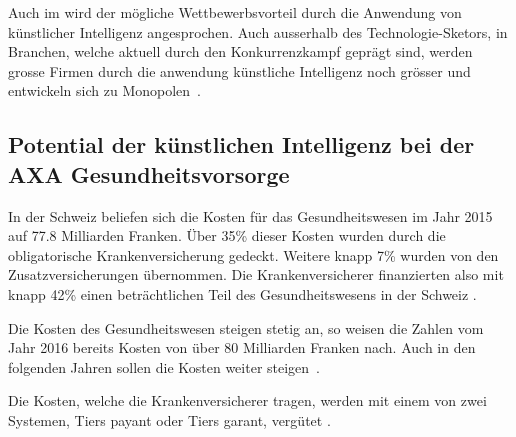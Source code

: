 \documentclass{hwz}
\begin{document}
Auch im \textcite{TheEconomist2018TheAI} wird der mögliche Wettbewerbsvorteil durch die Anwendung von künstlicher Intelligenz angesprochen. Auch ausserhalb des Technologie-Sketors, in Branchen, welche aktuell durch den Konkurrenzkampf geprägt sind, werden grosse Firmen durch die anwendung künstliche Intelligenz noch grösser und entwickeln sich zu Monopolen~\autocite{TheEconomist2018TheAI}.

\subsection{Potential der künstlichen Intelligenz bei der AXA Gesundheitsvorsorge}


In der Schweiz beliefen sich die Kosten für das Gesundheitswesen im Jahr 2015 auf 77.8 Milliarden Franken. Über 35\% dieser Kosten wurden durch die obligatorische Krankenversicherung gedeckt. Weitere knapp 7\% wurden von den Zusatzversicherungen übernommen. Die Krankenversicherer finanzierten also mit knapp 42\% einen beträchtlichen Teil des Gesundheitswesens in der Schweiz \autocite{BundesamtfurStatistik2018Finanzierung, BundesamtfurStatistik2017KostenDaten}.


Die Kosten des Gesundheitswesen steigen stetig an, so weisen die Zahlen vom Jahr 2016 bereits Kosten von über 80 Milliarden Franken nach. Auch in den folgenden Jahren sollen die Kosten weiter steigen~\autocite{BundesamtfurStatistik2018Finanzierung, Hehli2017GesundheitskostenWeiter}.


Die Kosten, welche die Krankenversicherer tragen, werden mit einem von zwei Systemen, Tiers payant oder Tiers garant, vergütet \autocite{EidgenossischesDepartementdesInnern2017FaktenblattVergutungssysteme}. 
\end{document}

